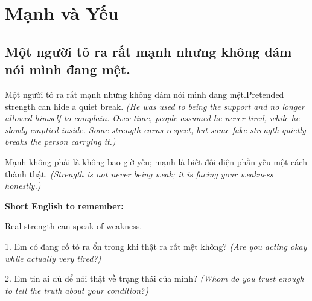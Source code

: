\chapter{Mạnh và Yếu}

\section{Một người tỏ ra rất mạnh nhưng không dám nói mình đang mệt.}
\begin{truyen}{Một người tỏ ra rất mạnh nhưng không dám nói mình đang mệt.}{Pretended strength can hide a quiet break.}
\textit{(He was used to being the support and no longer allowed himself to complain. Over time, people assumed he never tired, while he slowly emptied inside. Some strength earns respect, but some fake strength quietly breaks the person carrying it.)}
\end{truyen}
\begin{baihoc}
Mạnh không phải là không bao giờ yếu; mạnh là biết đối diện phần yếu một cách thành thật.
\textit{(Strength is not never being weak; it is facing your weakness honestly.)}
\end{baihoc}
\begin{ghinhoanh}
\textbf{Short English to remember:}

Real strength can speak of weakness.
\end{ghinhoanh}
\begin{tuhocnhanh}
1. Em có đang cố tỏ ra ổn trong khi thật ra rất mệt không? \textit{(Are you acting okay while actually very tired?)}

2. Em tin ai đủ để nói thật về trạng thái của mình? \textit{(Whom do you trust enough to tell the truth about your condition?)}
\end{tuhocnhanh}
\ngancach


